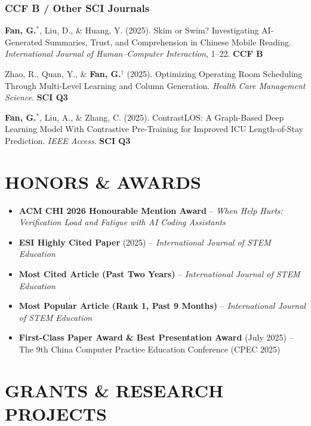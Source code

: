 \documentclass[a4paper,9pt]{extarticle}
\newcommand{\pubitem}[1]{\item #1}
\begin{document}
\subsubsection*{CCF B / Other SCI Journals}

\begin{enumerate}[label={[J\arabic*]}, resume]
    \pubitem{\textbf{Fan, G.}$^*$, Liu, D., \& Huang, Y. (2025). Skim or Swim? Investigating AI-Generated Summaries, Trust, and Comprehension in Chinese Mobile Reading. \textit{International Journal of Human--Computer Interaction}, 1--22. \textbf{CCF B}}
    
    \pubitem{Zhao, R., Quan, Y., \& \textbf{Fan, G.}$^\dag$ (2025). Optimizing Operating Room Scheduling Through Multi-Level Learning and Column Generation. \textit{Health Care Management Science}. \textbf{SCI Q3}}
    
    \pubitem{\textbf{Fan, G.}$^*$, Liu, A., \& Zhang, C. (2025). ContrastLOS: A Graph-Based Deep Learning Model With Contrastive Pre-Training for Improved ICU Length-of-Stay Prediction. \textit{IEEE Access}. \textbf{SCI Q3}}
\end{enumerate}

\section*{HONORS \& AWARDS}

\begin{itemize}[leftmargin=*]
    \item \textbf{ACM CHI 2026 Honourable Mention Award} -- \textit{When Help Hurts: Verification Load and Fatigue with AI Coding Assistants}
    \item \textbf{ESI Highly Cited Paper} (2025) -- \textit{International Journal of STEM Education}
    \item \textbf{Most Cited Article (Past Two Years)} -- \textit{International Journal of STEM Education}
    \item \textbf{Most Popular Article (Rank 1, Past 9 Months)} -- \textit{International Journal of STEM Education}
    \item \textbf{First-Class Paper Award \& Best Presentation Award} (July 2025) -- The 9th China Computer Practice Education Conference (CPEC 2025)
\end{itemize}

\section*{GRANTS \& RESEARCH PROJECTS}
\end{document}
